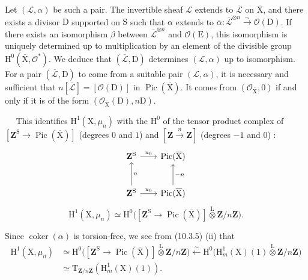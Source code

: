 \documentclass[11pt,leqno]{article}
\newcommand{\Page}[1]{\ifvmode\noindent\else\unskip\ \fi{\footnotesize\textcolor{gray}{[p.\,#1]}}\ \ignorespaces}
\begin{document}
Let \((\mathcal{L},\alpha)\) be such a pair. The invertible sheaf \(\mathcal{L}\) extends to \(\overline{\mathcal{L}}\) on \(\overline{\mathrm{X}}\), and there exists a divisor \(\mathrm{D}\) supported on \(\mathrm{S}\) such that \(\alpha\) extends to \(\bar\alpha:\overline{\mathcal{L}}^{\otimes n}\xrightarrow{\sim}\mathcal{O}(\mathrm{D})\). If there exists an isomorphism \(\beta\) between \(\overline{\mathcal{L}}^{\otimes n}\) and \(\mathcal{O}(\mathrm{E})\), this isomorphism is uniquely determined up to multiplication by an element of the divisible group \(\mathrm{H}^{0}(\overline{\mathrm{X}},\mathcal{O}^{*})\). We deduce that \((\overline{\mathcal{L}},\mathrm{D})\) determines \((\mathcal{L},\alpha)\) up to isomorphism. For a pair \((\overline{\mathcal{L}},\mathrm{D})\) to come from a suitable pair \((\mathcal{L},\alpha)\), it is necessary and sufficient that \(n[\overline{\mathcal{L}}]=[\mathcal{O}(\mathrm{D})]\) in \(\operatorname{Pic}(\overline{\mathrm{X}})\). It comes from \((\mathcal{O}_{\overline{\mathrm{X}}},0)\) if and only if it is of the form \((\mathcal{O}_{\overline{\mathrm{X}}}(\mathrm{D}),n\mathrm{D})\).

\Page{71}
This identifies \(\mathrm{H}^{1}(\mathrm{X},\mu_n)\) with the \(\mathrm{H}^{0}\) of the tensor product complex of \([\mathbf{Z}^{\mathrm{S}}\to\operatorname{Pic}(\overline{\mathrm{X}})]\) (degrees \(0\) and \(1\)) and \([\mathbf{Z}\xrightarrow{n}\mathbf{Z}]\) (degrees \(-1\) and \(0\)) :
\[
\begin{tikzcd}[column sep=2em,row sep=2.5em]
\mathbf{Z}^{\mathrm{S}} \arrow[r,"u_0"]
 & \operatorname{Pic}(\overline{\mathrm{X}})\\
\mathbf{Z}^{\mathrm{S}} \arrow[r,"u_0"] \arrow[u,"n"']
 & \operatorname{Pic}(\overline{\mathrm{X}}) \arrow[u,"-n"']
\end{tikzcd}
\]
\[
\mathrm{H}^{1}(\mathrm{X},\mu_n)
\simeq
\mathrm{H}^{0}\bigl(
[\mathbf{Z}^{\mathrm{S}}\to\operatorname{Pic}(\overline{\mathrm{X}})]
\overset{\mathrm{L}}{\otimes}\mathbf{Z}/n\mathbf{Z}\bigr).
\]

Since \(\operatorname{coker}(\alpha)\) is torsion-free, we see from (10.3.5) (ii) that
\[
\begin{aligned}
\mathrm{H}^{1}(\mathrm{X},\mu_n)
&\simeq
\mathrm{H}^{0}\bigl(
[\mathbf{Z}^{\mathrm{S}}\to\operatorname{Pic}(\overline{\mathrm{X}})]
\overset{\mathrm{L}}{\otimes}\mathbf{Z}/n\mathbf{Z}\bigr)
\xleftarrow{\sim}
\mathrm{H}^{0}\bigl(
\mathrm{H}^{1}_{m}(\mathrm{X})(1)
\overset{\mathrm{L}}{\otimes}\mathbf{Z}/n\mathbf{Z}\bigr)\\
&\simeq
\mathrm{T}_{\mathbf{Z}/n\mathbf{Z}}(\mathrm{H}^{1}_{m}(\mathrm{X})(1)).
\end{aligned}
\]
\end{document}
